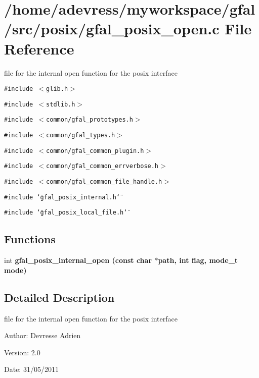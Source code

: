 \section{/home/adevress/myworkspace/gfal/src/posix/gfal\_\-posix\_\-open.c File Reference}
\label{gfal__posix__open_8c}
file for the internal open function for the posix interface 

{\tt \#include $<$glib.h$>$}\par
{\tt \#include $<$stdlib.h$>$}\par
{\tt \#include $<$common/gfal\_\-prototypes.h$>$}\par
{\tt \#include $<$common/gfal\_\-types.h$>$}\par
{\tt \#include $<$common/gfal\_\-common\_\-plugin.h$>$}\par
{\tt \#include $<$common/gfal\_\-common\_\-errverbose.h$>$}\par
{\tt \#include $<$common/gfal\_\-common\_\-file\_\-handle.h$>$}\par
{\tt \#include \char`\"{}gfal\_\-posix\_\-internal.h\char`\"{}}\par
{\tt \#include \char`\"{}gfal\_\-posix\_\-local\_\-file.h\char`\"{}}\par
\subsection*{Functions}
\begin{CompactItemize}
\item 
int \bf{gfal\_\-posix\_\-internal\_\-open} (const char $\ast$path, int flag, mode\_\-t mode)
\end{CompactItemize}


\subsection{Detailed Description}
file for the internal open function for the posix interface 

\begin{Desc}
\item[Author:]Devresse Adrien \end{Desc}
\begin{Desc}
\item[Version:]2.0 \end{Desc}
\begin{Desc}
\item[Date:]31/05/2011 \end{Desc}


